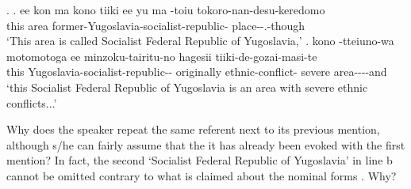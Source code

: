 %
\ex.\label{WO:TopicAppearClause-Initially:Ex:Yuugo}
 \ag. ee kon ma kono tiiki ee yu ma -toiu tokoro-nan-desu-keredomo \\
 	   this area    former-Yugoslavia-socialist-republic- place--.-though \\
	`This area is called Socialist Federal Republic of Yugoslavia,'
 \bg. kono -tteiuno-wa motomotoga ee minzoku-tairitu-no hagesii tiiki-de-gozai-masi-te \\
 	this Yugoslavia-socialist-republic-- originally  ethnic-conflict- severe area----and \\
	`this Socialist Federal Republic of Yugoslavia is an area with severe ethnic conflicts...'

Why does the speaker repeat the same referent next to its previous mention,
although s/he can fairly assume that the it has already been evoked with the first mention?
In fact, the second `Socialist Federal Republic of Yugoslavia' in line b cannot be omitted contrary to what is claimed about the nominal forms \cite{givon83,gundeletal93,ariel90}.
Why?

